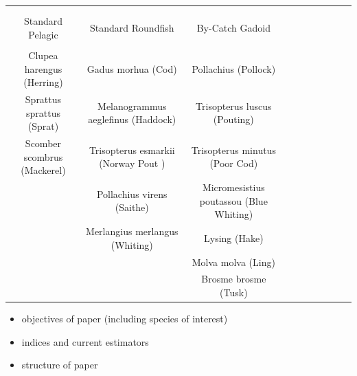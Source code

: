 \documentclass[a4paper 12pt]{article}
\numberwithin{equation}{section}
\begin{document}
\begin{table}[h!]
\centering
\setlength\tabcolsep{1.5pt} 
\begin{tabular}{cccccccccc}
\hline \\[0.1ex]
\multicolumn{2}{c}{} \\[0.1ex]
Standard Pelagic               & Standard Roundfish & By-Catch Gadoid       \\[1.5ex]
\hline \\[0.1ex]
 Clupea harengus (Herring) &  Gadus morhua (Cod)  & Pollachius (Pollock)      \\[1.5ex]
 Sprattus sprattus (Sprat)   & Melanogrammus aeglefinus (Haddock) & Trisopterus luscus (Pouting) \\[1.5ex]
 Scomber scombrus (Mackerel) & Trisopterus esmarkii (Norway Pout ) & Trisopterus minutus (Poor Cod) \\[1.5ex]
 & Pollachius virens (Saithe)  & Micromesistius poutassou (Blue Whiting)   \\[1.5ex]
& Merlangius merlangus (Whiting)  & Lysing (Hake)  \\[1.5ex]
& &  Molva molva (Ling) \\[1.5ex]
& &   Brosme brosme (Tusk) \\[0.5ex]
\hline
\end{tabular}
\end{table}

 \begin{itemize}
 \item objectives of paper (including species of interest)
 \item indices and current estimators
 \item structure of paper
 \end{itemize}
 
 
\end{document}
